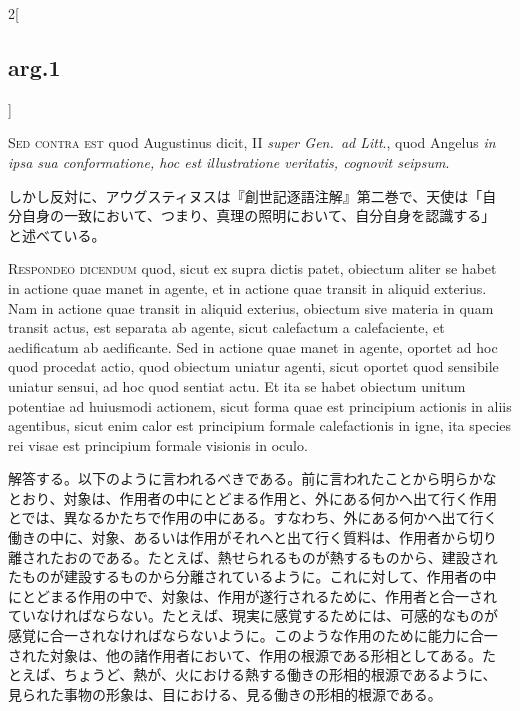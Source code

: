 \documentclass[paper=a4paper,fontsize=10pt,jafontsize=9pt,titlepage]{jlreq}
\begin{document}
\begin{paracol}{2}[\subsection{arg.1}]
\switchcolumn*[\subsection{s.c.}]

{\scshape Sed contra est} quod Augustinus dicit, II {\itshape super
Gen.~ad Litt}., quod Angelus {\itshape in ipsa sua conformatione, hoc
est illustratione veritatis, cognovit seipsum}.

\switchcolumn

しかし反対に、アウグスティヌスは『創世記逐語注解』第二巻で、天使は「自
分自身の一致において、つまり、真理の照明において、自分自身を認識する」
と述べている。


{\scshape Respondeo dicendum} quod, sicut ex supra dictis patet,
obiectum aliter se habet in actione quae manet in agente, et in
actione quae transit in aliquid exterius. Nam in actione quae transit
in aliquid exterius, obiectum sive materia in quam transit actus, est
separata ab agente, sicut calefactum a calefaciente, et aedificatum ab
aedificante. Sed in actione quae manet in agente, oportet ad hoc quod
procedat actio, quod obiectum uniatur agenti, sicut oportet quod
sensibile uniatur sensui, ad hoc quod sentiat actu. Et ita se habet
obiectum unitum potentiae ad huiusmodi actionem, sicut forma quae est
principium actionis in aliis agentibus, sicut enim calor est
principium formale calefactionis in igne, ita species rei visae est
principium formale visionis in oculo.

\switchcolumn

解答する。以下のように言われるべきである。前に言われたことから明らかな
とおり、対象は、作用者の中にとどまる作用と、外にある何かへ出て行く作用
とでは、異なるかたちで作用の中にある。すなわち、外にある何かへ出て行く
働きの中に、対象、あるいは作用がそれへと出て行く質料は、作用者から切り
離されたおのである。たとえば、熱せられるものが熱するものから、建設され
たものが建設するものから分離されているように。これに対して、作用者の中
にとどまる作用の中で、対象は、作用が遂行されるために、作用者と合一され
ていなければならない。たとえば、現実に感覚するためには、可感的なものが
感覚に合一されなければならないように。このような作用のために能力に合一
された対象は、他の諸作用者において、作用の根源である形相としてある。た
とえば、ちょうど、熱が、火における熱する働きの形相的根源であるように、
見られた事物の形象は、目における、見る働きの形相的根源である。


\end{paracol}
\end{document}

